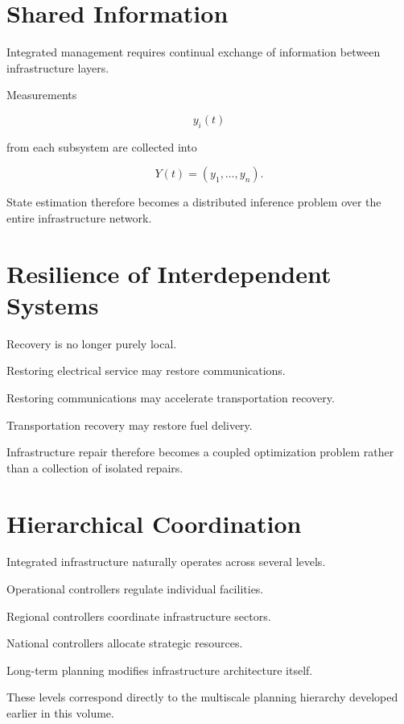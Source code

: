 \documentclass[11pt,fleqn]{book}
\numberwithin{equation}{chapter}
\theoremstyle{plain}
\theoremstyle{definition}
\theoremstyle{remark}
\begin{document}
\section{Shared Information}

Integrated management requires continual exchange of information between
infrastructure layers.

Measurements

\[
y_i(t)
\]

from each subsystem are collected into

\[
Y(t)
=
(y_1,\ldots,y_n).
\]

State estimation therefore becomes a distributed inference problem over
the entire infrastructure network.


\section{Resilience of Interdependent Systems}

Recovery is no longer purely local.

Restoring electrical service may restore communications.

Restoring communications may accelerate transportation recovery.

Transportation recovery may restore fuel delivery.

Infrastructure repair therefore becomes a coupled optimization problem
rather than a collection of isolated repairs.


\section{Hierarchical Coordination}

Integrated infrastructure naturally operates across several levels.

Operational controllers regulate individual facilities.

Regional controllers coordinate infrastructure sectors.

National controllers allocate strategic resources.

Long-term planning modifies infrastructure architecture itself.

These levels correspond directly to the multiscale planning hierarchy
developed earlier in this volume.
\end{document}
